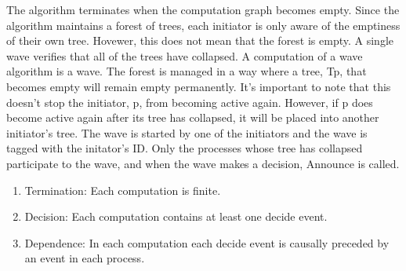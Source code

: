 \documentclass[letterpaper,10pt,english]{sphinxmanual}
\begin{document}
\sphinxAtStartPar
The algorithm terminates when the computation graph becomes empty. Since the algorithm maintains a forest of trees, each initiator is only aware of the emptiness of their own tree. Hovewer, this does not mean that the forest is empty. A single wave verifies that all of the trees have collapsed. A computation of a wave algorithm is a wave. The forest is  managed in a way where a tree, Tp, that becomes empty will remain empty permanently. It’s important to note that this doesn’t stop the initiator, p, from becoming active again. However, if p does become active again after its tree has collapsed, it will be placed into another initiator’s tree. The wave is started by one of the initiators and the wave is tagged with the initator’s ID. Only the processes whose tree has collapsed participate to the wave, and when the wave makes a decision, Announce is called.
\begin{description}
\begin{enumerate}
%
\item {} 
\sphinxAtStartPar
Termination: Each computation is finite.

\item {} 
\sphinxAtStartPar
Decision: Each computation contains at least one decide event.

\item {} 
\sphinxAtStartPar
Dependence: In each computation each decide event is causally preceded by an event in each process.

\end{enumerate}

\end{description}
\def\sphinxLiteralBlockLabel{\label{\detokenize{docs/ShavitFranchezAlg/algorithm:id2}}\label{\detokenize{docs/ShavitFranchezAlg/algorithm:shavitfranchesterminationdetectionalgorithm}}}
\end{document}
